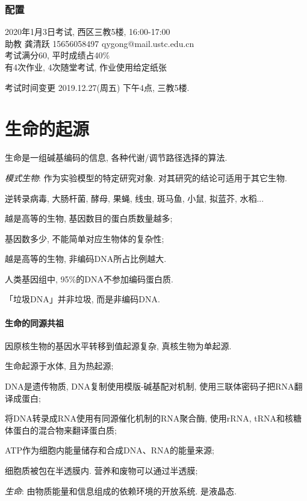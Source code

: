 \documentclass{ctexart}
\begin{document}
\subsubsection*{配置} %
\label{ssub:配置}

2020年1月3日考试, 西区三教5楼, 16:00-17:00\\
助教 龚清跃 15656058497 qygong@mail.ustc.edu.cn\\
考试满分60, 平时成绩占40\%\\
有4次作业, 4次随堂考试, 作业使用给定纸张\\
\begin{pitfall}
    考试时间变更 2019.12.27(周五) 下午4点, 三教5楼.
\end{pitfall}


\section{生命的起源} %
\label{sec:生命的起源}

生命是一组碱基编码的信息, 各种代谢/调节路径选择的算法.
\par
\emph{模式生物}: 作为实验模型的特定研究对象. 对其研究的结论可适用于其它生物.
\begin{ex}
    逆转录病毒, 大肠杆菌, 酵母, 果蝇, 线虫, 斑马鱼, 小鼠, 拟蓝芥, 水稻...
\end{ex}
\begin{cenum}
    \item 越是高等的生物, 基因数目的蛋白质数量越多;
    \item 基因数多少, 不能简单对应生物体的复杂性;
    \item 越是高等的生物, 非编码DNA所占比例越大.
\end{cenum}
人类基因组中, 95\%的DNA不参加编码蛋白质.
\par
「垃圾DNA」并非垃圾, 而是非编码DNA.
\paragraph{生命的同源共祖} %
\label{par:生命的同源共祖}

因原核生物的基因水平转移到值起源复杂, 真核生物为单起源.
\begin{cenum}
    \item 生命起源于水体, 且为热起源;
    \item DNA是遗传物质, DNA复制使用模版-碱基配对机制, 使用三联体密码子把RNA翻译成蛋白;
    \item 将DNA转录成RNA使用有同源催化机制的RNA聚合酶, 使用rRNA, tRNA和核糖体蛋白的混合物来翻译蛋白质;
    \item ATP作为细胞内能量储存和合成DNA、RNA的能量来源;
    \item 细胞质被包在半透膜内. 营养和废物可以通过半透膜;
    \item \emph{生命}: 由物质能量和信息组成的依赖环境的开放系统. 是液晶态.
\end{cenum}
\end{document}
